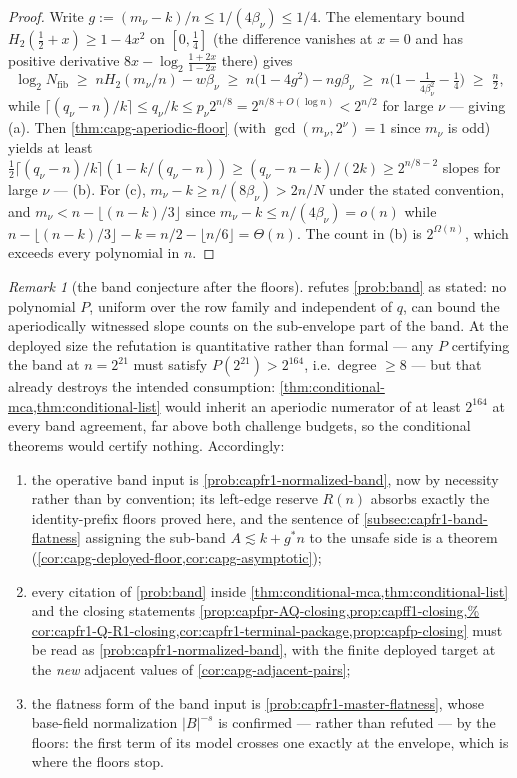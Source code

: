 \documentclass[11pt]{article}
\theoremstyle{definition}
\theoremstyle{remark}
\newtheorem{remark}[remark]{Remark}
\newcommand{\B}{B}
\begin{document}
\begin{proof}
Write $g:=(m_\nu-k)/n\leq 1/(4\beta_\nu)\leq 1/4$.  The elementary bound
$H_2(\tfrac12+x)\geq 1-4x^{2}$ on $[0,\tfrac14]$ (the difference vanishes at
$x=0$ and has positive derivative $8x-\log_2\frac{1+2x}{1-2x}$ there) gives
\[
\log_2 N_{\mathrm{fib}}\;\geq\;nH_2(m_\nu/n)-w\beta_\nu
\;\geq\;n\big(1-4g^{2}\big)-ng\beta_\nu
\;\geq\;n\Big(1-\tfrac{1}{4\beta_\nu^{2}}-\tfrac14\Big)\;\geq\;\tfrac n2 ,
\]
while $\lceil(q_\nu-n)/k\rceil\leq q_\nu/k\leq p_\nu 2^{n/8}=
2^{n/8+O(\log n)}<2^{n/2}$ for large $\nu$ --- giving (a).  Then
\cref{thm:capg-aperiodic-floor} (with $\gcd(m_\nu,2^\nu)=1$ since $m_\nu$ is
odd) yields at least
$\tfrac12\lceil(q_\nu-n)/k\rceil(1-k/(q_\nu-n))\geq
(q_\nu-n-k)/(2k)\geq 2^{n/8-2}$ slopes for large $\nu$ --- (b).  For (c),
$m_\nu-k\geq n/(8\beta_\nu)>2n/N$ under the stated convention, and
$m_\nu<n-\lfloor(n-k)/3\rfloor$ since $m_\nu-k\leq n/(4\beta_\nu)=o(n)$
while $n-\lfloor(n-k)/3\rfloor-k=n/2-\lfloor n/6\rfloor=\Theta(n)$.  The
count in (b) is $2^{\Omega(n)}$, which exceeds every polynomial in $n$.
\end{proof}

\begin{remark}[the band conjecture after the floors]\label{rem:capg-band}
 refutes \cref{prob:band} as stated: no
polynomial $P$, uniform over the row family and independent of $q$, can
bound the aperiodically witnessed slope counts on the sub-envelope part
of the band.  At the deployed size the refutation is quantitative rather
than formal --- any $P$ certifying the band at $n=2^{21}$ must satisfy
$P(2^{21})>2^{164}$, i.e.\ degree $\ge8$ --- but that already destroys
the intended consumption: \cref{thm:conditional-mca,thm:conditional-list}
would inherit an aperiodic numerator of at least $2^{164}$ at every band
agreement, far above both challenge budgets, so the conditional theorems
would certify nothing.  Accordingly:
\begin{enumerate}[label=\textup{(\roman*)}]
\item the operative band input is \cref{prob:capfr1-normalized-band}, now
by necessity rather than by convention; its left-edge reserve $R(n)$
absorbs exactly the identity-prefix floors proved here, and the sentence
of \cref{subsec:capfr1-band-flatness} assigning the sub-band
$A\lesssim k+g^{*}n$ to the unsafe side is a theorem
(\cref{cor:capg-deployed-floor,cor:capg-asymptotic});
\item every citation of \cref{prob:band} inside
\cref{thm:conditional-mca,thm:conditional-list} and the closing
statements \cref{prop:capfpr-AQ-closing,prop:capff1-closing,%
cor:capfr1-Q-R1-closing,cor:capfr1-terminal-package,prop:capfp-closing} must
be read as \cref{prob:capfr1-normalized-band}, with the finite deployed
target at the \emph{new} adjacent values of
\cref{cor:capg-adjacent-pairs};
\item the flatness form of the band input is
\cref{prob:capfr1-master-flatness}, whose base-field normalization
$|\B|^{-s}$ is confirmed --- rather than refuted --- by the floors: the
first term of its model crosses one exactly at the envelope, which is
where the floors stop.
\end{enumerate}
\end{remark}
\end{document}
